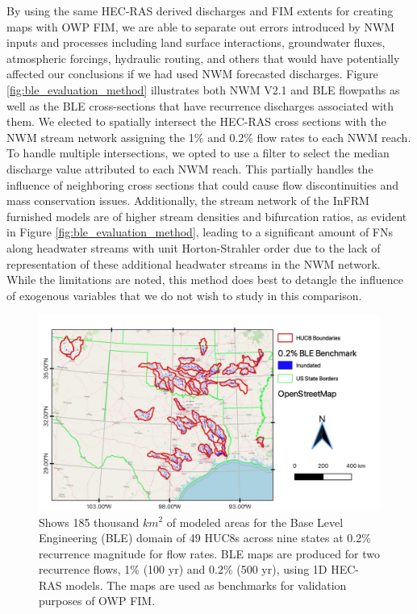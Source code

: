 By using the same HEC-RAS derived discharges and FIM extents for creating maps with OWP FIM, we are able to separate out errors introduced by NWM inputs and processes including land surface interactions, groundwater fluxes, atmospheric forcings, hydraulic routing, and others that would have potentially affected our conclusions if we had used NWM forecasted discharges.
Figure \ref{fig:ble_evaluation_method} illustrates both NWM V2.1 and BLE flowpaths as well as the BLE cross-sections that have recurrence discharges associated with them.
We elected to spatially intersect the HEC-RAS cross sections with the NWM stream network assigning the 1\% and 0.2\% flow rates to each NWM reach. 
To handle multiple intersections, we opted to use a filter to select the median discharge value attributed to each NWM reach.
This partially handles the influence of neighboring cross sections that could cause flow discontinuities and mass conservation issues.
Additionally, the stream network of the InFRM furnished models are of higher stream densities and bifurcation ratios, as evident in Figure \ref{fig:ble_evaluation_method}, leading to a significant amount of FNs along headwater streams with unit Horton-Strahler order due to the lack of representation of these additional headwater streams in the NWM network.
While the limitations are noted, this method does best to detangle the influence of exogenous variables that we do not wish to study in this comparison.
%
\begin{figure}[H]
\centering
\includegraphics[scale=1.0]{figures/all_ble_maps.jpg}
\caption{
Shows 185 thousand $km^2$ of modeled areas for the Base Level Engineering (BLE) domain of 49 HUC8s across nine states at 0.2\% recurrence magnitude for flow rates.
BLE maps are produced for two recurrence flows, 1\% (100 yr) and 0.2\% (500 yr), using 1D HEC-RAS models.
The maps are used as benchmarks for validation purposes of OWP FIM.
}
\label{fig:all_ble_maps}
\end{figure}
